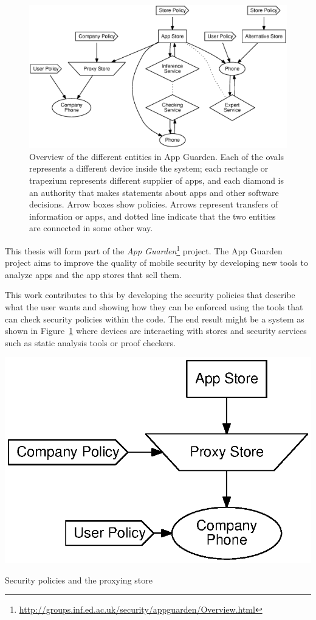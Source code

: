 \documentclass[a4paper,sfsidenotes]{tufte-book}
\begin{document}
\begin{figure}\label{fig:ag}
  \includegraphics[width=\linewidth]{img/appguarden.eps}
  \caption{Overview of the different entities in App Guarden.  Each of the ovals
  represents a different device inside the system; each rectangle or trapezium
  represents  different supplier of apps, and each diamond is an authority that
  makes statements about apps and other software decisions.  Arrow boxes show
policies.  Arrows represent transfers of information or apps, and dotted line
indicate that the two entities are connected in some other way.}
\end{figure}

This thesis will form part of the \emph{App
Guarden}\footnote{\url{http://groups.inf.ed.ac.uk/security/appguarden/Overview.html}}
project.  The App Guarden project aims to improve the quality of mobile security
by developing new tools to analyze apps and the app stores that sell them.

This work contributes to this by developing the security policies that describe
what the user wants and showing how they can be enforced using the tools that
can check security policies within the code.  The end result might be a system
as shown in Figure~\ref{fig:ag} where devices are interacting with stores and
security services such as static analysis tools or proof checkers. 

\begin{marginfigure}
  \label{fig:proxy}
  \includegraphics[width=\linewidth]{img/proxystore.eps}
  \caption{Security policies and the proxying store}
\end{marginfigure}
\end{document}
